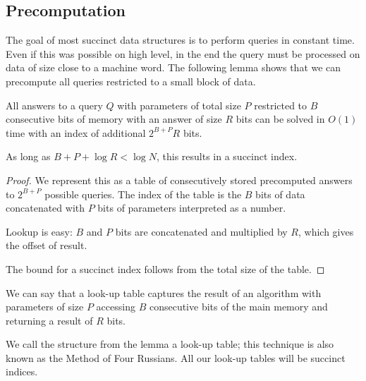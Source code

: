 \subsection{Precomputation}

The goal of most succinct data structures is to perform queries in constant time.
Even if this was possible on high level, in the end the query must be processed on data of size close to a machine word.
The following lemma shows that we can precompute all queries restricted to a small block of data.

\begin{lemma}
	All answers to a query $Q$ with parameters of total size $P$ restricted to $B$ consecutive bits of memory with an answer of size $R$ bits can be solved in $O(1)$ time with an index of additional $2^{B+P} R$ bits.
	
	As long as $B + P + \log R < \log N$, this results in a succinct index.
\end{lemma}
\begin{proof}
	We represent this as a table of consecutively stored precomputed answers to $2^{B+P}$ possible queries.
	The index of the table is the $B$ bits of data concatenated with $P$ bits of parameters interpreted as a number.

	Lookup is easy: $B$ and $P$ bits are concatenated and multiplied by $R$, which gives the offset of result.
	
	The bound for a succinct index follows from the total size of the table.
\end{proof}

We can say that a look-up table captures the result of an algorithm with parameters of size $P$ accessing $B$ consecutive bits of the main memory and returning a result of $R$ bits.

We call the structure from the lemma a look-up table; this technique is also known as the Method of Four Russians.
All our look-up tables will be succinct indices.

\bigbreak

